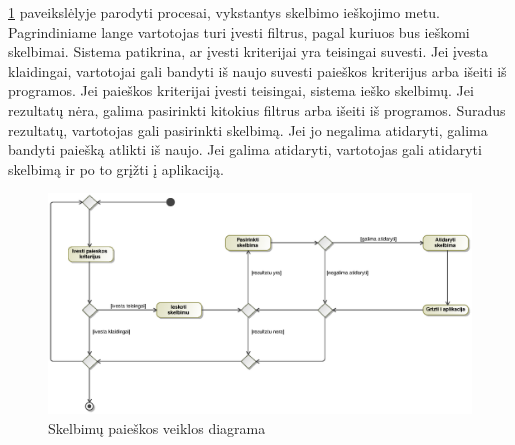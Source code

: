 \documentclass[12pt]{article}
\begin{document}
	\ref{SearchActivity} paveikslėlyje parodyti procesai, vykstantys skelbimo ieškojimo metu. Pagrindiniame lange vartotojas turi įvesti filtrus, pagal kuriuos bus ieškomi skelbimai. Sistema patikrina, ar įvesti kriterijai yra teisingai suvesti. Jei įvesta klaidingai, vartotojai gali bandyti iš naujo suvesti paieškos kriterijus arba išeiti iš programos. Jei paieškos kriterijai įvesti teisingai, sistema ieško skelbimų. Jei rezultatų nėra, galima pasirinkti kitokius filtrus arba išeiti iš programos. Suradus rezultatų, vartotojas gali pasirinkti skelbimą. Jei jo negalima atidaryti, galima bandyti paiešką atlikti iš naujo. Jei galima atidaryti, vartotojas gali atidaryti skelbimą ir po to grįžti į aplikaciją.
	\begin{figure}[h]
		\begin{center}
			\includegraphics[width=\textwidth]{PaieskosVeikla.eps}
			\caption{Skelbimų paieškos veiklos diagrama\label{SearchActivity}}
		\end{center}
	\end{figure}
	
	\pagebreak
	
\end{document}
